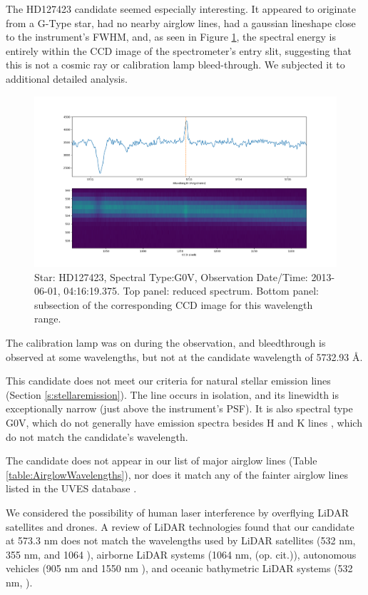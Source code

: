 \documentclass[twocolumn]{aastex701}
\begin{document}
The HD127423 candidate seemed especially interesting.  It appeared to originate from a G-Type star, had no nearby airglow lines, had a gaussian lineshape close to the instrument's FWHM, and, as seen in Figure \ref{fig:seti_candidate_HD127423}, the spectral energy is entirely within the CCD image of the spectrometer's entry slit, suggesting that this is not a cosmic ray or calibration lamp bleed-through.  We subjected it to additional detailed analysis.

\begin{figure}
    \centering  \includegraphics[width=\textwidth]{HD127423.png}
    \caption{Star: HD127423, Spectral Type:G0V, Observation Date/Time: 2013-06-01, 04:16:19.375. Top panel: reduced spectrum.  Bottom panel: subsection of the corresponding CCD image for this wavelength range.}
    \label{fig:seti_candidate_HD127423}
\end{figure}

The calibration lamp was on during the observation, and bleedthrough is observed at some wavelengths, but not at the candidate wavelength of 5732.93 \AA.

This candidate does not meet our criteria for natural stellar emission lines (Section \ref{s:stellaremission}).  The line occurs in isolation, and its linewidth is exceptionally narrow (just above the instrument's PSF). It is also spectral type G0V, which do not generally have emission spectra besides H and K lines \citep{HandKemissionlines}, which do not match the candidate's wavelength. 

The candidate does not appear in our list of major airglow lines (Table \ref{table:AirglowWavelengths}), nor does it match any of the fainter airglow lines listed in the UVES database \citep{faint_airglow_database} \citep{UVES_database}. 

We considered the possibility of human laser interference by overflying LiDAR satellites and drones.  A review of LiDAR technologies found that our candidate at 573.3 nm does not match the wavelengths used by LiDAR satellites (532 nm, 355 nm, and 1064 \citep{lidar_history}), airborne LiDAR systems (1064 nm, (op. cit.)), autonomous vehicles (905 nm and 1550 nm \citep{vehicle_lidar}), and oceanic bathymetric LiDAR systems (532 nm, \citep{bathymetric_lidar}). 
\end{document}
